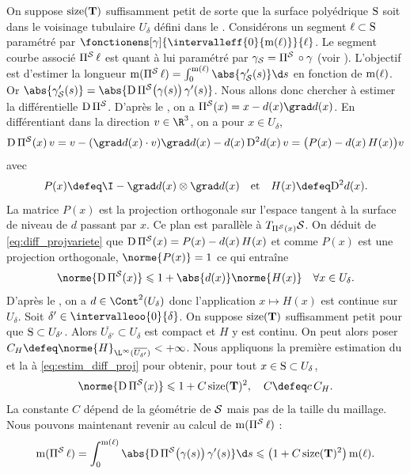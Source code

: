 \begin{demo}
On suppose $\operatorname{size}(\mathbf{T})$ suffisamment petit de sorte que la surface polyédrique $\mathrm{S}$ soit dans le voisinage tubulaire $U_\delta$ défini dans le . Considérons un segment $\ell \subset \mathrm{S}$ paramétré par $\fonctionens[\gamma]{\intervalleff{0}{\mesure(\ell)}}{\ell}$. Le segment courbe associé $\operatorname{\Pi^{\mathcal{S}}} \ell$ est quant à lui paramétré par $\gamma_{\mathcal{S}} = \operatorname{\Pi^{\mathcal{S}}}{} \circ \gamma$  (voir ). L'objectif est d'estimer la longueur $\mesure(\projvariete \ell) = \int_0^{\mesure(\ell)} \abs{\gamma'_\surflisse(s)} \d s$ en fonction de $\operatorname{m}(\ell)$. Or $\abs{\gamma'_\surflisse(s)} = \abs{\diff \projvariete\mathopen{}\big(\gamma(s)\big) \, \gamma'(s)}$. Nous allons donc chercher à estimer la différentielle $\mathrm{D} \operatorname{\Pi^{\mathcal{S}}}$. D'après le , on a $\projvariete(x) = x - d(x) \grad d(x)$. En différentiant dans la direction $v \in \R^3$, on a pour $x \in U_\delta$,
\begin{equation} \label{eq:diff_projvariete}
\diff \projvariete(x) \, v = v - (\grad d(x) \cdot v ) \grad d(x) - d(x) \, \diff^2 d(x) \, v = \big( P(x) - d(x) \, H(x) \big) v
\end{equation}
avec
\[
P(x) \defeq \I - \grad d(x) \otimes \grad d(x) 
\quad
\text{et}
\quad
H(x) \defeq \diff^2 d(x).
\]
La matrice $P(x)$ est la projection orthogonale sur l'espace tangent à la surface de niveau de $d$ passant par $x$. Ce plan est parallèle à $T_{\operatorname{\Pi^{\mathcal{S}}}(x)} \mathcal{S}$. On déduit de \ref{eq:diff_projvariete} que $\mathrm{D} \operatorname{\Pi^{\mathcal{S}}}(x) = P(x) - d(x) \, H(x)$ et comme $P(x)$ est une projection orthogonale, $\norme{P(x)}=1$ ce qui entraîne
\begin{equation} \label{eq:estim_diff_proj}
\norme{\diff \projvariete(x)} \leqslant 1 + \abs{d(x)} \norme{H(x)} \quad \forall x \in U_\delta.
\end{equation}
D'après le , on a $d \in \Cont^2(U_\delta)$ donc l'application $x \mapsto H(x)$ est continue sur $U_\delta$. Soit $\delta' \in \intervalleoo{0}{\delta}$. On suppose $\operatorname{size}(\mathbf{T})$ suffisamment petit pour que $\mathrm{S} \subset U_{\delta'}$. Alors $\overline{U_{\delta'}} \subset U_\delta$ est compact et $H$ y est continu. On peut alors poser $C_H \defeq \norme{H}_{\L^\infty(\overline{U_{\delta'}})} < + \infty$. Nous appliquons la première estimation du  et la  à \ref{eq:estim_diff_proj} pour obtenir, pour tout $x \in \mathrm{S} \subset U_\delta$,
\[
\norme{\diff \projvariete(x)} \leqslant 1 + C \size(\ensddfvplat)^2,
\quad   
C \defeq c \, C_{H}.
\]
La constante $C$ dépend de la géométrie de $\mathcal{S}$ mais pas de la taille du maillage. Nous pouvons maintenant revenir au calcul de $\operatorname{m}(\operatorname{\Pi^{\mathcal{S}}} \ell)$ : 
\[
\mesure(\projvariete \ell)
= \int_0^{\mesure(\ell)} \abs{\diff \projvariete\mathopen{}\big(\gamma(s)\big) \, \gamma'(s)} \d s \leqslant \big( 1 + C \size(\ensddfvplat)^2 \big) \mesure(\ell).
\]
\end{demo}